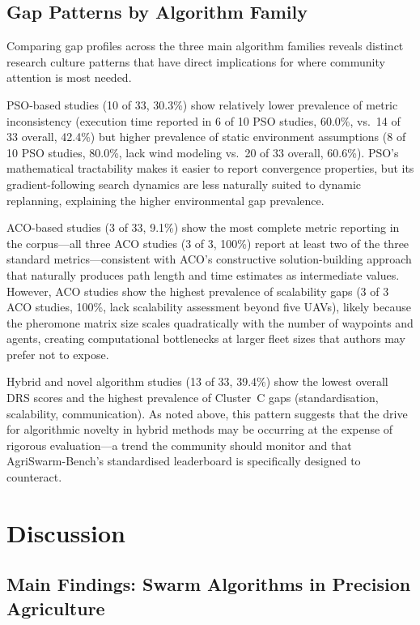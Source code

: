 \documentclass[review,3p,times]{elsarticle}
\begin{document}
\subsection{Gap Patterns by Algorithm Family}

Comparing gap profiles across the three main algorithm families reveals distinct research culture patterns that have direct implications for where community attention is most needed.

PSO-based studies (10 of 33, 30.3\%) show relatively lower prevalence of metric inconsistency (execution time reported in 6 of 10 PSO studies, 60.0\%, vs.\ 14 of 33 overall, 42.4\%) but higher prevalence of static environment assumptions (8 of 10 PSO studies, 80.0\%, lack wind modeling vs.\ 20 of 33 overall, 60.6\%). PSO's mathematical tractability makes it easier to report convergence properties, but its gradient-following search dynamics are less naturally suited to dynamic replanning, explaining the higher environmental gap prevalence.

ACO-based studies (3 of 33, 9.1\%) show the most complete metric reporting in the corpus---all three ACO studies (3 of 3, 100\%) report at least two of the three standard metrics---consistent with ACO's constructive solution-building approach that naturally produces path length and time estimates as intermediate values. However, ACO studies show the highest prevalence of scalability gaps (3 of 3 ACO studies, 100\%, lack scalability assessment beyond five UAVs), likely because the pheromone matrix size scales quadratically with the number of waypoints and agents, creating computational bottlenecks at larger fleet sizes that authors may prefer not to expose.

Hybrid and novel algorithm studies (13 of 33, 39.4\%) show the lowest overall DRS scores and the highest prevalence of Cluster~C gaps (standardisation, scalability, communication). As noted above, this pattern suggests that the drive for algorithmic novelty in hybrid methods may be occurring at the expense of rigorous evaluation---a trend the community should monitor and that AgriSwarm-Bench's standardised leaderboard is specifically designed to counteract.


\section{Discussion}
\label{sec:discussion}

\subsection{Main Findings: Swarm Algorithms in Precision Agriculture}
\end{document}

